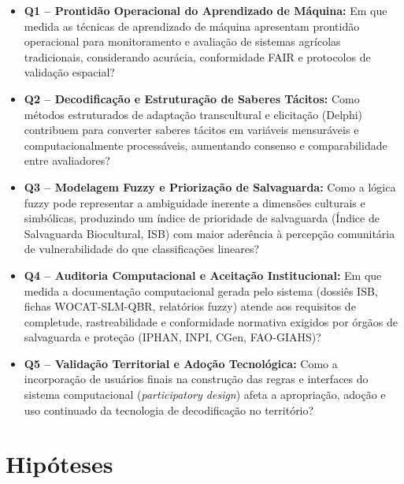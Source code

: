 \begin{itemize}

\item \textbf{Q1 – Prontidão Operacional do Aprendizado de Máquina:}
Em que medida as técnicas de aprendizado de máquina apresentam prontidão operacional para monitoramento e avaliação de sistemas agrícolas tradicionais, considerando acurácia, conformidade FAIR e protocolos de validação espacial?

\item \textbf{Q2 – Decodificação e Estruturação de Saberes Tácitos:}
Como métodos estruturados de adaptação transcultural e elicitação (Delphi) contribuem para converter saberes tácitos em variáveis mensuráveis e computacionalmente processáveis, aumentando consenso e comparabilidade entre avaliadores?

\item \textbf{Q3 – Modelagem Fuzzy e Priorização de Salvaguarda:}
Como a lógica fuzzy pode representar a ambiguidade inerente a dimensões culturais e simbólicas, produzindo um índice de prioridade de salvaguarda (Índice de Salvaguarda Biocultural, ISB) com maior aderência à percepção comunitária de vulnerabilidade do que classificações lineares?

\item \textbf{Q4 – Auditoria Computacional e Aceitação Institucional:}
Em que medida a documentação computacional gerada pelo sistema (dossiês ISB, fichas WOCAT-SLM-QBR, relatórios fuzzy) atende aos requisitos de completude, rastreabilidade e conformidade normativa exigidos por órgãos de salvaguarda e proteção (IPHAN, INPI, CGen, FAO-GIAHS)?

\item \textbf{Q5 – Validação Territorial e Adoção Tecnológica:}
Como a incorporação de usuários finais na construção das regras e interfaces do sistema computacional (\textit{participatory design}) afeta a apropriação, adoção e uso continuado da tecnologia de decodificação no território?

\end{itemize}


\section{Hipóteses}

